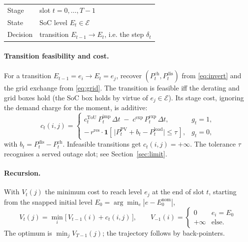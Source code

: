 \documentclass[11pt]{article}
\newcommand{\Pimp}{P^{\text{imp}}}
\newcommand{\Pexp}{P^{\text{exp}}}
\newcommand{\Pch}{P^{\text{ch}}}
\newcommand{\Pdis}{P^{\text{dis}}}
\newcommand{\Ppv}{P^{\text{PV}}}
\newcommand{\Pload}{P^{\text{load}}}
\newcommand{\ctou}{c^{\text{ToU}}}
\newcommand{\cexp}{c^{\text{exp}}}
\newcommand{\rres}{r^{\text{res}}}
\begin{document}
\begin{center}
\begin{tabular}{ll}
\toprule
Stage & slot $t = 0,\dots,T-1$\\
State & SoC level $E_t \in \mathcal{E}$\\
Decision & transition $E_{t-1}\!\to\!E_t$, i.e. the step $\delta_t$\\
\bottomrule
\end{tabular}
\end{center}

\paragraph{Transition feasibility and cost.}
For a transition $E_{t-1}=e_i \to E_t=e_j$, recover $(\Pch_t,\Pdis_t)$ from
\eqref{eq:invert} and the grid exchange from \eqref{eq:grid}. The transition is
feasible iff the derating and grid boxes hold (the SoC box holds by virtue of
$e_j\in\mathcal{E}$). Its stage cost, ignoring the demand charge for the moment,
is additive:
\begin{equation}
  c_t(i,j) =
  \begin{cases}
    \ctou_t\,\Pimp_t\,\Delta t \;-\; \cexp\,\Pexp_t\,\Delta t, & g_t = 1,\\[4pt]
    -\,\rres \cdot \mathbf{1}\!\left[\,\bigl|\Ppv_t + b_t - \Pload_t\bigr| \le \tau\,\right], & g_t = 0,
  \end{cases}
  \label{eq:stagecost}
\end{equation}
with $b_t=\Pdis_t-\Pch_t$. Infeasible transitions get $c_t(i,j)=+\infty$. The
tolerance $\tau$ recognises a served outage slot; see Section~\ref{sec:limit}.

\paragraph{Recursion.} With $V_t(j)$ the minimum cost to reach level $e_j$ at the
end of slot $t$, starting from the snapped initial level
$E_0\!=\!\arg\min_{e}|e-E_0^{\text{nom}}|$,
\begin{equation}
  V_t(j) = \min_{i} \bigl[\,V_{t-1}(i) + c_t(i,j)\,\bigr],
  \qquad
  V_{-1}(i)=\begin{cases}0 & e_i=E_0\\ +\infty & \text{else.}\end{cases}
\end{equation}
The optimum is $\min_j V_{T-1}(j)$; the trajectory follows by back-pointers.
\end{document}
